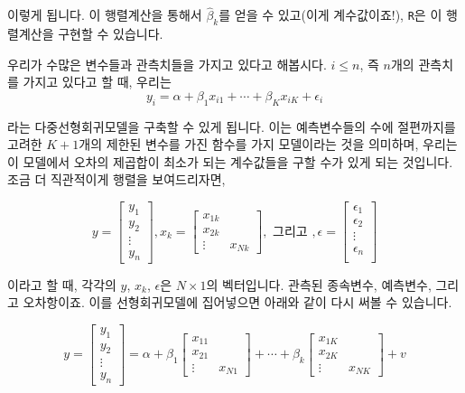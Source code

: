 \documentclass[
]{book}
\begin{document}
이렇게 됩니다. 이 행렬계산을 통해서 \(\hat{\beta}_k\)를 얻을 수 있고(이게 계수값이죠!), \texttt{R}은 이 행렬계산을 구현할 수 있습니다.

우리가 수많은 변수들과 관측치들을 가지고 있다고 해봅시다. \(i \leq n\), 즉 \(n\)개의 관측치를 가지고 있다고 할 때, 우리는
\[
y_i = \alpha + \beta_1x_{i1} + \cdots + \beta_{K}x_{iK} + \epsilon_i
\]

라는 다중선형회귀모델을 구축할 수 있게 됩니다. 이는 예측변수들의 수에 절편까지를 고려한 \(K+1\)개의 제한된 변수를 가진 함수를 가지 모델이라는 것을 의미하며, 우리는 이 모델에서 오차의 제곱합이 최소가 되는 계수값들을 구할 수가 있게 되는 것입니다. 조금 더 직관적이게 행렬을 보여드리자면,

\[
y = \begin{bmatrix}y_1 \\ y_2 \\ \vdots \\ y_n \end{bmatrix}, 
x_k = \begin{bmatrix}x_{1k} \\ x_{2k} \\ \vdots & x_{Nk}\end{bmatrix}, 
\text{  그리고  },
\epsilon = \begin{bmatrix} \epsilon_1 \\ \epsilon_2 \\ \vdots \\ \epsilon_n \\\end{bmatrix}
\]

이라고 할 때, 각각의 \(y\), \(x_k\), \(\epsilon\)은 \(N\times 1\)의 벡터입니다. 관측된 종속변수, 예측변수, 그리고 오차항이죠. 이를 선형회귀모델에 집어넣으면 아래와 같이 다시 써볼 수 있습니다.

\[
y = \begin{bmatrix}y_1 \\ y_2 \\ \vdots \\ y_n \end{bmatrix} = \alpha + \beta_1
\begin{bmatrix}x_{11} \\ x_{21} \\ \vdots & x_{N1}\end{bmatrix} + \cdots + \beta_k\begin{bmatrix}x_{1K} \\ x_{2K} \\ \vdots & x_{NK}\end{bmatrix} + v
\]
\end{document}
